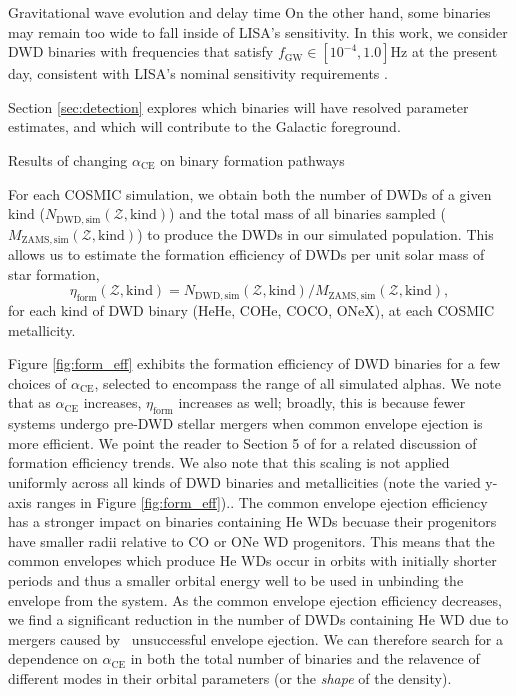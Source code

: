 \documentclass[twocolumn]{aastex631}
\newcommand*{\metallicity}{\mathcal{Z}}
\newcommand*{\alphaCE}{\alpha_{\mathrm{CE}}}
\begin{document}
\begin{subsection}{Gravitational wave evolution and delay time}
On the other hand, some binaries may remain too wide
    to fall inside of LISA's sensitivity.
In this work, we consider DWD binaries with frequencies
    that satisfy $f_{\mathrm{GW}} \in [10^{-4}, 1.0] \mathrm{Hz}$ at the present day,
    consistent with LISA's nominal sensitivity requirements \citep{LISASensitivity}.

Section \ref{sec:detection} explores which binaries will have resolved 
    parameter estimates,
    and which will contribute to the Galactic foreground.
\end{subsection}

\begin{subsection}{Results of changing $\alphaCE$ on binary formation pathways}

For each COSMIC simulation,
    we obtain both the number of DWDs of a given kind 
    ($N_{\mathrm{DWD,sim}}(\metallicity,\mathrm{kind})$)
    and the total mass of all binaries sampled
    ($M_{\mathrm{ZAMS,sim}}(\metallicity,\mathrm{kind})$)
    to produce the DWDs in our simulated population.
This allows us to estimate the formation efficiency of DWDs per unit solar mass of star formation, 
\begin{equation} \label{eq:form_eff}
\eta_{\mathrm{form}}(\metallicity, \mathrm{kind}) = 
    N_{\mathrm{DWD,sim}}(\metallicity,\mathrm{kind}) /
    M_{\mathrm{ZAMS,sim}}(\metallicity,\mathrm{kind}),
\end{equation}
    for each kind of DWD binary (HeHe, COHe, COCO, ONeX),
    at each COSMIC metallicity.

Figure \ref{fig:form_eff} exhibits the formation efficiency of DWD binaries for
    a few choices of $\alphaCE$, selected to encompass the range of all simulated alphas.
We note that as $\alphaCE$ increases, $\eta_{\mathrm{form}}$ increases as well;
    broadly, this is because fewer systems undergo pre-DWD stellar mergers when 
    common envelope ejection is more efficient.
We point the reader to Section 5 of
    \citet{Thiele2023} for a related discussion of formation efficiency trends.
We also note that this scaling is not applied uniformly across all kinds 
    of DWD binaries and metallicities
    (note the varied y-axis ranges in Figure \ref{fig:form_eff})..
The common envelope ejection efficiency has a stronger impact on binaries 
    containing He WDs becuase their progenitors have smaller radii relative to 
    CO or ONe WD progenitors. 
This means that the common envelopes which produce He WDs occur in orbits with 
    initially shorter periods and thus a smaller orbital energy well to be used 
    in unbinding the envelope from the system. 
As the common envelope ejection efficiency decreases, we find a significant 
    reduction in the number of DWDs containing He WD due to mergers caused by \
    unsuccessful envelope ejection.
We can therefore search for a dependence on $\alphaCE$ in both  
    the total number of binaries and the relavence of different modes in their orbital parameters
    (or the \textit{shape} of the density).
    

\end{subsection}
\end{document}
